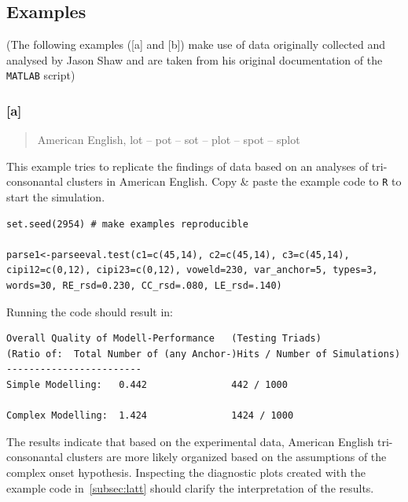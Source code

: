\documentclass[
draft=false,
toc=graduated,
listof=totoc,
headsepline=true,
]%
{scrartcl}
\begin{document}
\subsection{Examples}
\label{subsec:exe}
\begin{flushleft}
\begin{scriptsize}
(The following examples ([a] and [b]) make use of data originally collected and analysed by Jason Shaw and are taken from his original documentation of the \texttt{MATLAB} script)
\end{scriptsize}
\end{flushleft}
\subsubsection*{[a]}
\label{subsubsec:a}
\begin{center}
\begin{quote}
American English, lot -- pot -- sot -- plot -- spot -- splot \parencite{Browman1988}
\end{quote}
\end{center}
This example tries to replicate the findings of data based on an analyses of tri-con\-so\-nan\-tal clusters in American English.
\pagebreak
Copy \& paste the example code to \texttt{R} to start the simulation.
\begin{lstlisting}
set.seed(2954) # make examples reproducible

parse1<-parseeval.test(c1=c(45,14), c2=c(45,14), c3=c(45,14), cipi12=c(0,12), cipi23=c(0,12), voweld=230, var_anchor=5, types=3, words=30, RE_rsd=0.230, CC_rsd=.080, LE_rsd=.140)
\end{lstlisting}
Running the code should result in:
\begin{lstlisting}
Overall Quality of Modell-Performance	(Testing Triads)
(Ratio of:	Total Number of (any Anchor-)Hits / Number of Simulations)
------------------------
Simple Modelling:	0.442				442 / 1000

Complex Modelling:	1.424				1424 / 1000
\end{lstlisting}
The results indicate that based on the experimental data, American English tri-con\-so\-nan\-tal clusters are more likely organized based on the assumptions of the complex onset hypothesis. Inspecting the diagnostic plots created with the example code in~\ref{subsec:latt} should clarify the interpretation of the results.
\end{document}

